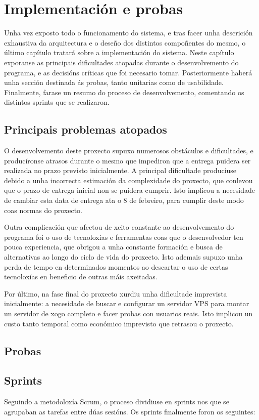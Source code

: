 \chapter{Implementación e probas}
\label{ch:implementacion}
Unha vez exposto todo o funcionamento do sistema, e tras facer unha descrición
exhaustiva da arquitectura e o deseño dos distintos compoñentes do mesmo, o
último capítulo tratará sobre a implementación do sistema. Neste capítulo
exporanse as principais dificultades atopadas durante o desenvolvemento do
programa, e as decisións críticas que foi necesario tomar. Posteriormente haberá
unha sección destinada ás probas, tanto unitarias como de usabilidade.
Finalmente, farase un resumo do proceso de desenvolvemento, comentando os
distintos sprints que se realizaron.

\section{Principais problemas atopados}
O desenvolvemento deste proxecto supuxo numerosos obstáculos e dificultades, e
producíronse atrasos durante o mesmo que impediron que a entrega puidera ser
realizada no prazo previsto inicialmente. A principal dificultade produciuse
debido a unha incorrecta estimación da complexidade do proxecto, que conlevou
que o prazo de entrega inicial non se puidera cumprir. Isto implicou a
necesidade de cambiar esta data de entrega ata o 8 de febreiro, para cumplir
deste modo coas normas do proxecto.
\par
Outra complicación que afectou de xeito constante ao desenvolvemento do
programa foi o uso de tecnoloxías e ferramentas coas que o desenvolvedor ten
pouca experiencia, que obrigou a unha constante formación e busca de
alternativas ao longo do ciclo de vida do proxecto. Isto ademais supuxo unha
perda de tempo en determinados momentos ao descartar o uso de certas tecnoloxías
en beneficio de outras máis axeitadas.
\par
Por último, na fase final do proxecto xurdiu unha dificultade imprevista
inicialmente: a necesidade de buscar e configurar un servidor VPS para montar un
servidor de xogo completo e facer probas con usuarios reais. Isto implicou un
custo tanto temporal como económico imprevisto que retrasou o proxecto.

\section{Probas}

\section{Sprints}
Seguindo a metodoloxía Scrum, o proceso dividiuse en sprints nos que se
agrupaban as tarefas entre dúas sesións. Os sprints finalmente foron os
seguintes:
